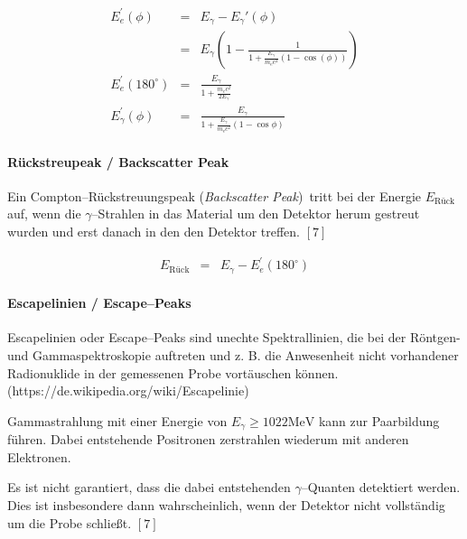 \documentclass[12pt,a4paper]{scrartcl}
\numberwithin{equation}{section} %
\newcommand{\pu}[1]{\ensuremath{\mathrm{#1}}}
\renewcommand{\[}{} %
\renewcommand{\]}{\noindent} %
\begin{document}
\[
\begin{eqnarray}
    E_e^\prime(\phi)
        &=& E_{\gamma} - E_{\gamma}'(\phi) \\
        &=& E_{\gamma}
            \left(
                1-
                \frac{1}{1+\frac{E_{\gamma}}{m_\mathrm ec^2}
                    (1-\cos(\phi))}
            \right) \label{Compton--Kontinuum} \\
    E_e^\prime(180^\circ) &=& \frac{E_\gamma}{1+\frac{m_ec^2}{2E_\gamma}}
        \label{Compton--Kante} \\
    E_{\gamma}^\prime(\phi)
        &=& \frac{E_{\gamma}}{1+\frac{E_{\gamma}}{m_\mathrm ec^2}
            (1-\cos\phi)} \label{Klein--Nishina}
\end{eqnarray}
\]

\hypertarget{ruxfcckstreupeak-backscatter-peak}{%
\paragraph{Rückstreupeak / Backscatter
Peak}\label{ruxfcckstreupeak-backscatter-peak}}

Ein Compton--Rückstreuungspeak (\emph{Backscatter Peak})~tritt bei der
Energie \(E_\mathrm{Rück}\) auf, wenn die \(\gamma\)--Strahlen in das
Material um den Detektor herum gestreut wurden und erst danach in den
den Detektor treffen. \([7]\)

\[
\begin{eqnarray}
    E_\mathrm{Rück} &=& E_\gamma - E_e^\prime(180^\circ)
\end{eqnarray}
\]

\hypertarget{escapelinien-escapepeaks}{%
\paragraph{Escapelinien /
Escape--Peaks}\label{escapelinien-escapepeaks}}

Escapelinien oder Escape--Peaks sind unechte Spektrallinien, die bei der
Röntgen- und Gammaspektroskopie auftreten und z. B. die Anwesenheit
nicht vorhandener Radionuklide in der gemessenen Probe vortäuschen
können. (https://de.wikipedia.org/wiki/Escapelinie)

Gammastrahlung mit einer Energie von \(E_\gamma\ge\pu{1022MeV}\) kann
zur Paarbildung führen. Dabei entstehende Positronen zerstrahlen
wiederum mit anderen Elektronen.

Es ist nicht garantiert, dass die dabei entstehenden \(\gamma\)--Quanten
detektiert werden. Dies ist insbesondere dann wahrscheinlich, wenn der
Detektor nicht vollständig um die Probe schließt. \([7]\)
\end{document}
